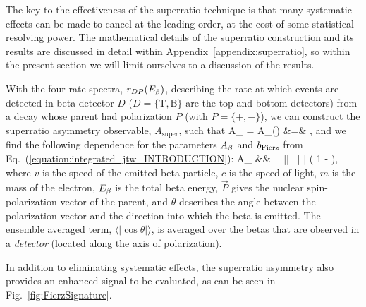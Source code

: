 The key to the effectiveness of the superratio technique is that many systematic effects can be made to cancel at the leading order, at the cost of some statistical resolving power.  The mathematical details of the superratio construction and its results are discussed in detail within Appendix~\ref{appendix:superratio}, so within the present section we will limit ourselves to a discussion of the results.


With the four rate spectra, $r_{D P}(E_{\beta})$, describing the rate at which events are detected in beta detector $D$ ($D =\{ \mathrm{T, B}  \}$ are the top and bottom detectors) from a decay whose parent had polarization $P$ (with $P=\{+,-\}$), we can construct the superratio asymmetry observable, $A_{\mathrm{super}}$, such that
\bea
A_{} \;\;=\;\; A_{}(\Ebeta) 
&=& ,
\eea
and we find the following dependence for the parameters $A_{\beta}$ and $b_{\mathrm{Fierz}}$ from Eq.~(\ref{equation:integrated_jtw_INTRODUCTION}):
\bea
A_{} &\approx& \Abeta \,  \, || \, \langle | \cos\theta | \rangle \left( 1 - \bFierz {} \right), 
\eea
where $v$ is the speed of the emitted beta particle, $c$ is the speed of light, $m$ is the mass of the electron, $E_{\beta}$ is the total beta energy, $\vec{P}$ gives the nuclear spin-polarization vector of the parent, and $\theta$ describes the angle between the polarization vector and the direction into which the beta is emitted.  The ensemble averaged term, $\langle | \cos\theta | \rangle$, is averaged over the betas that are observed in a \emph{detector} (located along the axis of polarization).

In addition to eliminating systematic effects, the superratio asymmetry also provides an enhanced signal to be evaluated, as can be seen in Fig.~\ref{fig:FierzSignature}.

